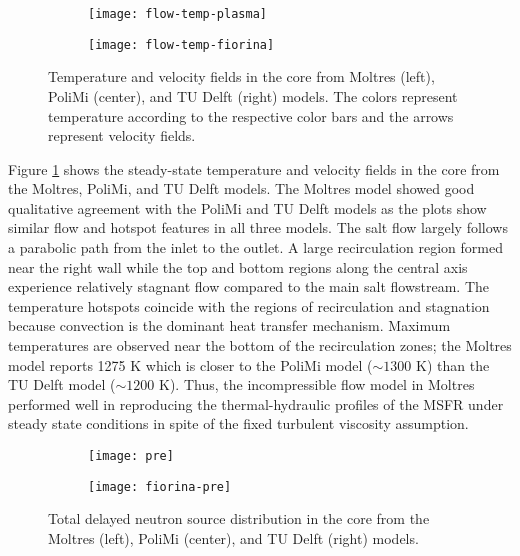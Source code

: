 \begin{figure}[htb!]
    \centering
    \begin{subfigure}[t]{.35\textwidth}
        \centering
        \texttt{[image: flow-temp-plasma]}
    \end{subfigure}
    \hfill
    \begin{subfigure}[t]{.625\textwidth}
        \centering
        \texttt{[image: flow-temp-fiorina]}
    \end{subfigure}
    \caption{Temperature and velocity fields in the core from Moltres
    (left), PoliMi (center), and TU Delft (right) models. The colors represent
    temperature according to the respective color bars and the arrows
    represent velocity fields. \cite{park_advancement_2020}}
    \label{fig:flow-temp}
\end{figure}

Figure \ref{fig:flow-temp} shows the steady-state temperature and velocity
fields in the core from the Moltres, PoliMi, and TU Delft models. The Moltres
model showed
good qualitative agreement with the PoliMi and TU Delft models as the plots
show similar flow and hotspot features in all three models. The salt flow
largely follows a parabolic path from the inlet to the outlet. A large
recirculation region formed near the right wall while the top and bottom
regions along the central axis experience relatively stagnant flow compared to
the main salt flowstream. The temperature hotspots coincide with the regions of
recirculation and stagnation because convection is the dominant heat transfer
mechanism. Maximum temperatures are observed near the bottom of the
recirculation zones; the Moltres model reports 1275 K which is closer to the
PoliMi model ($\sim1300$ K) than the TU Delft model ($\sim1200$ K). Thus, the
incompressible flow model in Moltres performed well in reproducing the
thermal-hydraulic profiles of the \gls{MSFR} under steady state conditions in
spite of the fixed turbulent viscosity assumption.

\begin{figure}[b!]
    \centering
    \begin{subfigure}[t]{.30\textwidth}
        \centering
        \vspace{.9cm}
        \texttt{[image: pre]}
    \end{subfigure}
    \begin{subfigure}[t]{.69\textwidth}
        \centering
        \vspace{0pt}
        \texttt{[image: fiorina-pre]}
    \end{subfigure}
    \caption{Total delayed neutron source distribution in the core from the
    Moltres (left), PoliMi (center), and TU Delft (right) models.}
    \label{fig:pre}
\end{figure}

